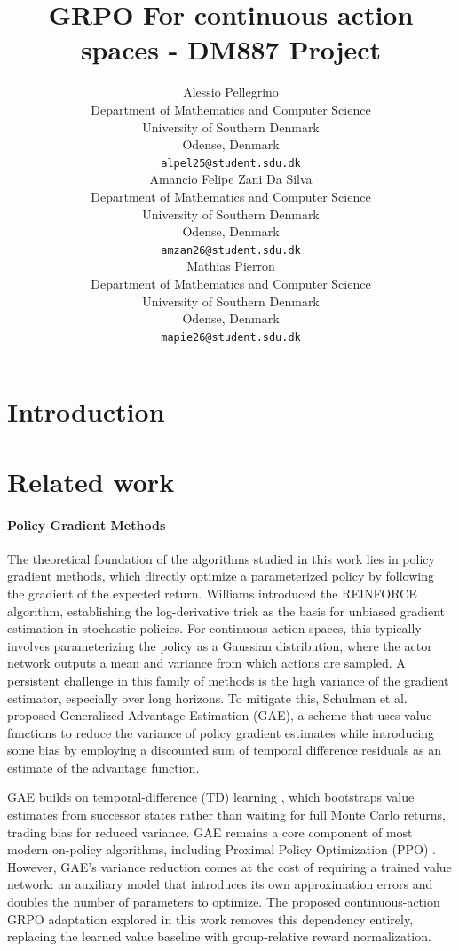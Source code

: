 \documentclass{article}
\title{GRPO For continuous action spaces - DM887 Project}
\author{%
  Alessio Pellegrino \\
  Department of Mathematics and Computer Science\\
  University of Southern Denmark\\
  Odense, Denmark \\
  \texttt{alpel25@student.sdu.dk} \\
  \And
  Amancio Felipe Zani Da Silva \\
  Department of Mathematics and Computer Science\\
  University of Southern Denmark\\
  Odense, Denmark \\
  \texttt{amzan26@student.sdu.dk} \\
  \And
  Mathias Pierron \\
  Department of Mathematics and Computer Science\\
  University of Southern Denmark\\
  Odense, Denmark \\
  \texttt{mapie26@student.sdu.dk}
}
\begin{document}
\maketitle

\section{Introduction}

\section{Related work}

\paragraph{Policy Gradient Methods}
The theoretical foundation of the algorithms studied in this work lies in policy gradient
methods, which directly optimize a parameterized policy by following the gradient of the expected return.
Williams \cite{williams1992simple} introduced the REINFORCE algorithm, establishing the log-derivative trick as the basis for unbiased gradient estimation in stochastic policies. For continuous action spaces, this typically involves parameterizing the policy as a Gaussian distribution, where the actor network outputs a mean and variance from which actions are sampled. A persistent challenge in this family of methods is the high variance of the gradient estimator, especially over long
horizons. To mitigate this, Schulman et al. \cite{schulman2015high} proposed Generalized Advantage Estimation (GAE), a scheme that uses value functions to reduce the variance of policy gradient estimates while introducing some bias by employing a discounted sum of temporal difference residuals as an estimate of the advantage function.

GAE builds on temporal-difference (TD) learning \cite{sutton1988learning}, which bootstraps value estimates from successor states rather than waiting for full Monte Carlo returns, trading bias for reduced variance.
GAE remains a core component of most modern on-policy algorithms, including Proximal Policy Optimization (PPO) \cite{schulman2017proximal}.
However, GAE's variance reduction comes at the cost of requiring a trained value network: an auxiliary model that introduces its own approximation errors and doubles the number of parameters to optimize. The proposed continuous-action GRPO adaptation  explored in this work removes this dependency entirely, replacing the learned value baseline with group-relative reward normalization.
\end{document}

